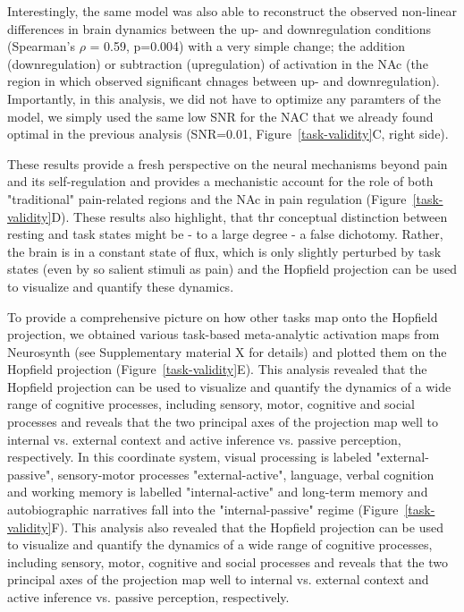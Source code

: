 \documentclass{article}
\begin{document}
Interestingly, the same model was also able to reconstruct the observed non-linear differences in brain dynamics between the up- and downregulation conditions (Spearman's $\rho$ = 0.59, p=0.004) with a very simple change; the addition (downregulation) or subtraction (upregulation) of activation in the NAc (the region in which \href{https://doi.org/10.1371/journal.pbio.1002036}{} observed significant chnages between up- and downregulation). Importantly, in this analysis, we did not have to optimize any paramters of the model, we simply used the same low SNR for the NAC that we already found optimal in the previous analysis (SNR=0.01, Figure~\ref{task-validity}C, right side).

These results provide a fresh perspective on the neural mechanisms beyond pain and its self-regulation and provides a mechanistic account for the role of both "traditional" pain-related regions and the NAc in pain regulation (Figure~\ref{task-validity}D). These results also highlight, that thr conceptual distinction between resting and task states might be - to a large degree - a false dichotomy. Rather, the brain is in a constant state of flux, which is only slightly perturbed by task states (even by so salient stimuli as pain) and the Hopfield projection can be used to visualize and quantify these dynamics.

To provide a comprehensive picture on how other tasks map onto the Hopfield projection, we obtained various task-based meta-analytic activation maps from Neurosynth (see Supplementary material X for details)  and plotted them on the Hopfield projection (Figure~\ref{task-validity}E). This analysis revealed that the Hopfield projection can be used to visualize and quantify the dynamics of a wide range of cognitive processes, including sensory, motor, cognitive and social processes and reveals that the two principal axes of the projection map well to internal vs. external context and active inference vs. passive perception, respectively.
In this coordinate system, visual processing is labeled "external-passive", sensory-motor processes "external-active", language, verbal cognition and working memory is labelled "internal-active" and long-term memory and autobiographic narratives fall into the "internal-passive" regime (Figure~\ref{task-validity}F). This analysis also revealed that the Hopfield projection can be used to visualize and quantify the dynamics of a wide range of cognitive processes, including sensory, motor, cognitive and social processes and reveals that the two principal axes of the projection map well to internal vs. external context and active inference vs. passive perception, respectively.
\end{document}
